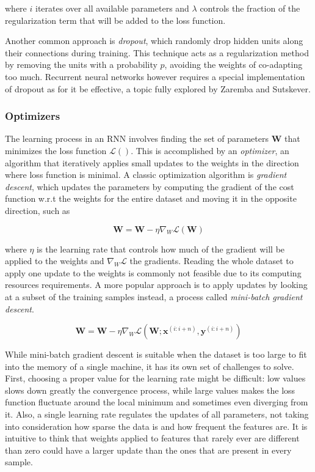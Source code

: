 \documentclass{kththesis}
\begin{document}
where $i$ iterates over all available parameters and $\lambda$ controls the fraction of the regularization term that will be added to the loss function.

Another common approach is \emph{dropout}\citep{srivastava2014dropout}, which randomly drop hidden units along their connections during training. This technique acts as a regularization method by removing the units with a probability $p$, avoiding the weights of co-adapting too much. Recurrent neural networks however requires a special implementation of dropout as for it be effective, a topic fully explored by Zaremba and Sutskever\citep{zaremba2014recurrent}.

\subsubsection{Optimizers}

The learning process in an RNN involves finding the set of parameters $\mathbf{W}$ that minimizes the loss function $\mathcal{L}()$. This is accomplished by an \emph{optimizer}, an algorithm that iteratively applies small updates to the weights in the direction where loss function is minimal. A classic optimization algorithm is \emph{gradient descent}, which updates the parameters by computing the gradient of the cost function w.r.t the weights for the entire dataset and moving it in the opposite direction, such as

\begin{equation}
\mathbf{W} = \mathbf{W} - \eta \nabla_W \mathcal{L}(\mathbf{W}) 
\end{equation}

where $\eta$ is the learning rate that controls how much of the gradient will be applied to the weights and $\nabla_W \mathcal{L}$ the gradients. Reading the whole dataset to apply one update to the weights is commonly not feasible due to its computing resources requirements. A more popular approach is to apply updates by looking at a subset of the training samples instead, a process  called \emph{mini-batch gradient descent}.

\begin{equation}
\mathbf{W} = \mathbf{W} - \eta \nabla_W \mathcal{L}(\mathbf{W}; \mathbf{x}^{(i:i+n)},\mathbf{y}^{(i:i+n)}) 
\end{equation}

While mini-batch gradient descent is suitable when the dataset is too large to fit into the memory of a single machine, it has its own set of challenges to solve. First, choosing a proper value for the learning rate might be difficult: low values slows down greatly the convergence process, while large values makes the loss function fluctuate around the local minimum and sometimes even diverging from it. Also, a single learning rate regulates the updates of all parameters, not taking into consideration how sparse the data is and how frequent the features are. It is intuitive to think that weights applied to features that rarely ever are different than zero could have a larger update than the ones that are present in every sample.
\end{document}
